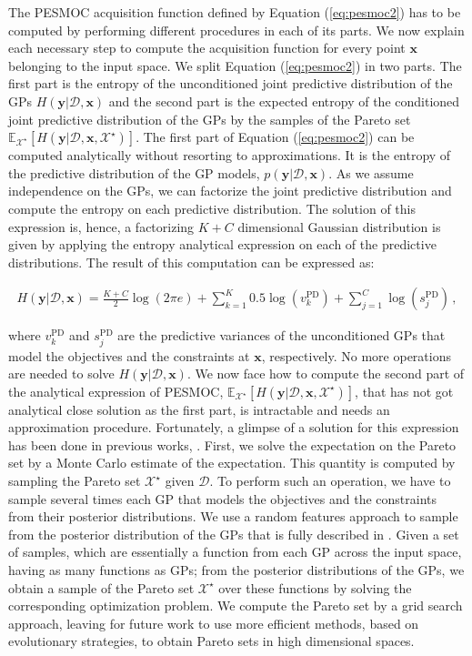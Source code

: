 The PESMOC acquisition function defined by Equation (\ref{eq:pesmoc2}) has to be computed by performing different procedures in each of its parts. We now explain each necessary step to compute the acquisition function for every point $\mathbf{x}$ belonging to the input space. We split Equation (\ref{eq:pesmoc2}) in two parts. The first part is the entropy of the unconditioned joint predictive distribution of the GPs $H(\textbf{y}|\mathcal{D},\textbf{x})$ and the second part is the expected entropy of the conditioned joint predictive distribution of the GPs by the samples of the Pareto set $\mathbb{E}_{\mathcal{X}^{\star}} [H(\textbf{y}|\mathcal{D},\textbf{x},\mathcal{X}^{\star})]$. The first part of Equation (\ref{eq:pesmoc2}) can be computed analytically without resorting to approximations. It is the entropy of the predictive distribution of the GP models,
$p(\mathbf{y}|\mathcal{D}, \textbf{x})$. As we assume independence on the GPs, we can factorize the joint predictive distribution and compute the entropy on each predictive distribution. The solution of this expression is, hence, a factorizing $K+C$ dimensional
Gaussian distribution is given by applying the entropy analytical expression on each of the predictive distributions. The result of this computation can be expressed as:

\begin{align}
H(\textbf{y}|\mathcal{D},\textbf{x}) = \frac{K+C}{2}\log(2\pi e) + \sum_{k=1}^{K}0.5\log(v_{k}^\text{PD}) + \sum_{j=1}^{C}\log(s_j^\text{PD})\,,
        \label{eq:entr_ini}
\end{align}

where $v_k^\text{PD}$ and $s_j^\text{PD}$ are the predictive variances of the unconditioned GPs that model the objectives and the constraints at $\mathbf{x}$, respectively. No more operations are needed to solve $H(\textbf{y}|\mathcal{D},\textbf{x})$. We now face how to compute the second part of the analytical expression of PESMOC, $\mathbb{E}_{\mathcal{X}^{\star}} [H(\textbf{y}|\mathcal{D},\textbf{x},\mathcal{X}^{\star})]$, that has not got analytical close solution as the first part, is intractable and needs an approximation procedure. Fortunately, a glimpse of a solution for this expression has been done in previous works, \citep{hernandez2014predictive,hernandez2016}. First, we solve the expectation on the Pareto set by a Monte Carlo estimate of the expectation. This quantity is computed by sampling the Pareto
set $\mathcal{X}^{\star}$ given $\mathcal{D}$. To perform such an operation, we have to sample several times each GP that models the objectives
and the constraints from their posterior distributions. We use a random features approach to sample from the posterior distribution of the GPs that is fully described in \citep{hernandez2014predictive,hernandez2016}. Given a set of samples, which are essentially a function from each GP across the input space, having as many functions as GPs; from the posterior distributions of the GPs, we obtain a sample of the Pareto set $\mathcal{X}^\star$ over these functions by solving the corresponding optimization problem. We compute the Pareto set by a grid search approach, leaving for future work to use more efficient methods,
based on evolutionary strategies, to obtain Pareto sets in high dimensional spaces. 

